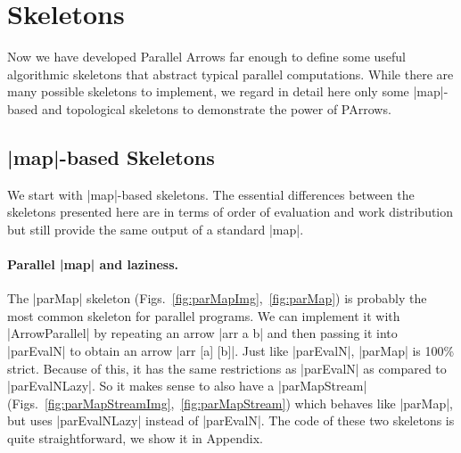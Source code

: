 \section{Skeletons}
\label{sec:skeletons}
Now we have developed Parallel Arrows far enough to define some useful algorithmic skeletons that abstract typical parallel computations. While there are many possible skeletons to implement, we regard in detail here only some |map|-based and topological skeletons to demonstrate the power of PArrows.
\subsection{|map|-based Skeletons}
\label{sec:map-skeletons}
We start with |map|-based skeletons. The essential differences between the skeletons presented here are in terms of order of evaluation and work distribution but still provide the same output of a standard |map|. 

\paragraph{Parallel |map| and laziness.}
The |parMap| skeleton (Figs.~\ref{fig:parMapImg},~\ref{fig:parMap}) is probably the most common skeleton for parallel programs. We can implement it with |ArrowParallel| by repeating an arrow |arr a b| and then passing it into |parEvalN| to obtain an arrow |arr [a] [b]|.
Just like |parEvalN|, |parMap| is 100\% strict.
Because of this, it has the same restrictions as |parEvalN| as compared to |parEvalNLazy|. So it makes sense to also have a |parMapStream| (Figs.~\ref{fig:parMapStreamImg},~\ref{fig:parMapStream}) which behaves like |parMap|, but uses |parEvalNLazy| instead of |parEvalN|. The code of these two skeletons is quite straightforward, we show it in Appendix.

